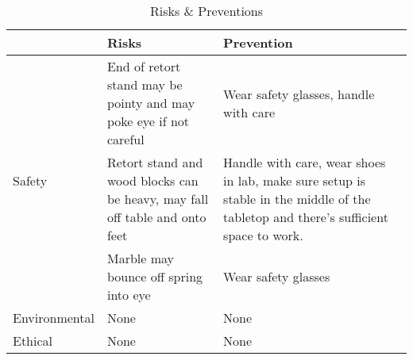 \begin{table}[!htb]
    \begin{center}
        \begin{tabular}{|l|p{5cm}|p{5cm}|} 
            \hline
            ~ & Risks & Prevention \\ 
            \hline
            \multirow{3}{4em}{Safety} & End of retort stand may be pointy and may poke eye if not careful & Wear safety glasses, handle with care \\ 
            \cline{2-3}
            & Retort stand and wood blocks can be heavy, may fall off table and onto feet & Handle with care, wear shoes in lab, make sure setup is stable in the middle of the tabletop and there's sufficient space to work.\\
            \cline{2-3}
            & Marble may bounce off spring into eye & Wear safety glasses \\
            \hline
            Environmental & None & None \\
            \hline
            Ethical & None & None  \\ 
            \hline
        \end{tabular}
        \caption{Risks \& Preventions}
    \end{center}
\end{table}
\newpage